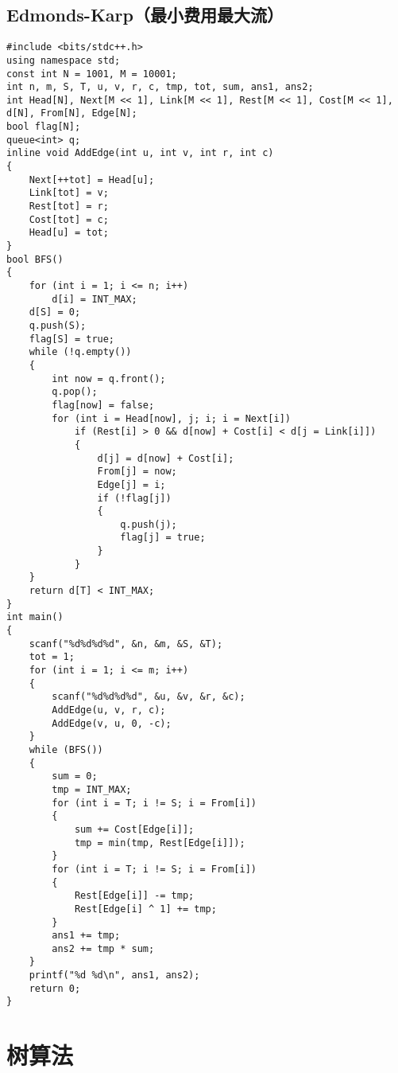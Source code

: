 \documentclass[a4paper]{article}
\begin{document}
\subsection{Edmonds-Karp（最小费用最大流）}
\begin{lstlisting}
#include <bits/stdc++.h>
using namespace std;
const int N = 1001, M = 10001;
int n, m, S, T, u, v, r, c, tmp, tot, sum, ans1, ans2;
int Head[N], Next[M << 1], Link[M << 1], Rest[M << 1], Cost[M << 1], d[N], From[N], Edge[N];
bool flag[N];
queue<int> q;
inline void AddEdge(int u, int v, int r, int c)
{
	Next[++tot] = Head[u];
	Link[tot] = v;
	Rest[tot] = r;
	Cost[tot] = c;
	Head[u] = tot;
}
bool BFS()
{
	for (int i = 1; i <= n; i++)
		d[i] = INT_MAX;
	d[S] = 0;
	q.push(S);
	flag[S] = true;
	while (!q.empty())
	{
		int now = q.front();
		q.pop();
		flag[now] = false;
		for (int i = Head[now], j; i; i = Next[i])
			if (Rest[i] > 0 && d[now] + Cost[i] < d[j = Link[i]])
			{
				d[j] = d[now] + Cost[i];
				From[j] = now;
				Edge[j] = i;
				if (!flag[j])
				{
					q.push(j);
					flag[j] = true;
				}
			}
	}
	return d[T] < INT_MAX;
}
int main()
{
    scanf("%d%d%d%d", &n, &m, &S, &T);
    tot = 1;
    for (int i = 1; i <= m; i++)
    {
        scanf("%d%d%d%d", &u, &v, &r, &c);
        AddEdge(u, v, r, c);
        AddEdge(v, u, 0, -c);
    }
    while (BFS())
    {
        sum = 0;
        tmp = INT_MAX;
        for (int i = T; i != S; i = From[i])
        {
            sum += Cost[Edge[i]];
            tmp = min(tmp, Rest[Edge[i]]);
        }
        for (int i = T; i != S; i = From[i])
        {
            Rest[Edge[i]] -= tmp;
            Rest[Edge[i] ^ 1] += tmp;
        }
        ans1 += tmp;
        ans2 += tmp * sum;
    }
    printf("%d %d\n", ans1, ans2);
	return 0;
}
\end{lstlisting}
\section{树算法}
\end{document}
